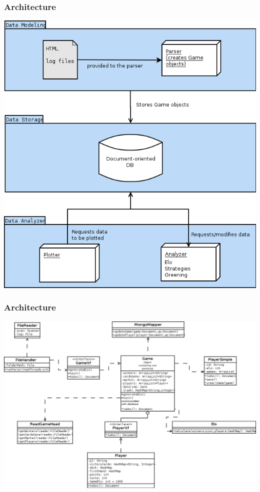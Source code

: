 \documentclass{beamer}
\begin{document}
\begin{frame}
  \frametitle{Architecture}
  \begin{center}
    \includegraphics[scale=0.30,keepaspectratio]{globalArch_v2}
    \end{center}
\end{frame}

\begin{frame}
  \frametitle{Architecture}
  \begin{center}
    \includegraphics[scale=0.27,keepaspectratio]{parserArch}
    \end{center}
\end{frame}
\end{document}
